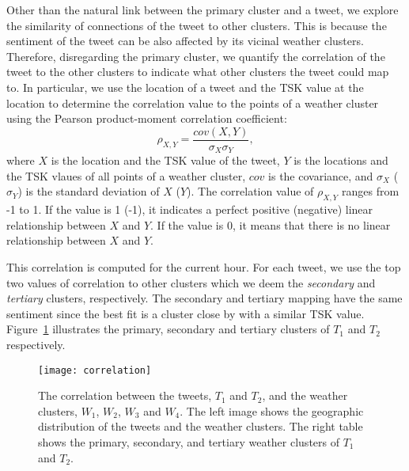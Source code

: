 Other than the natural link between the primary cluster and a tweet, we explore the similarity of connections of the tweet to other clusters. %
This is because the sentiment of the tweet can be also affected by its vicinal weather clusters. Therefore, disregarding the primary cluster, we quantify the correlation of the tweet to the other clusters to indicate what other clusters the tweet could map to. In particular, we use the location of a tweet and the TSK value at the location to determine the correlation value to the points of a weather cluster using the Pearson product-moment correlation coefficient:
\begin{equation}
\label{eq:pearson}
\rho_{X,Y}=\frac{cov(X,Y)}{\sigma_{X}\sigma_{Y}},
\end{equation}
where $X$ is the location and the TSK value of the tweet, $Y$ is the locations and the TSK vlaues of all points of a weather cluster, $cov$ is the covariance, and $\sigma_{X}$ ($\sigma_{Y}$) is the standard deviation of $X$ ($Y$). The correlation value of $\rho_{X,Y}$ ranges from -1 to 1. If the value is 1 (-1), it indicates a perfect positive (negative) linear relationship between $X$ and $Y$. If the value is 0, it means that there is no linear relationship between $X$ and $Y$.

This correlation is computed for the current hour. For each tweet, we use the top two values of correlation to other clusters which we deem the \emph{secondary} and \emph{tertiary} clusters, respectively. The secondary and tertiary mapping have the same sentiment since the best fit is a cluster close by with a similar TSK value. Figure~\ref{fig:correlation} illustrates the primary, secondary and tertiary clusters of $T_1$ and $T_2$ respectively.



\begin{figure}[t]
\begin{center}
\texttt{[image: correlation]}
\end{center}
\vspace{-.1in}
\caption{The correlation between the tweets, $T_1$ and $T_2$, and the weather clusters, $W_1$, $W_2$, $W_3$ and $W_4$. The left image shows the geographic distribution of the tweets and the weather clusters. The right table shows the primary, secondary, and tertiary weather clusters of $T_1$ and $T_2$.}
\label{fig:correlation}
\end{figure}

